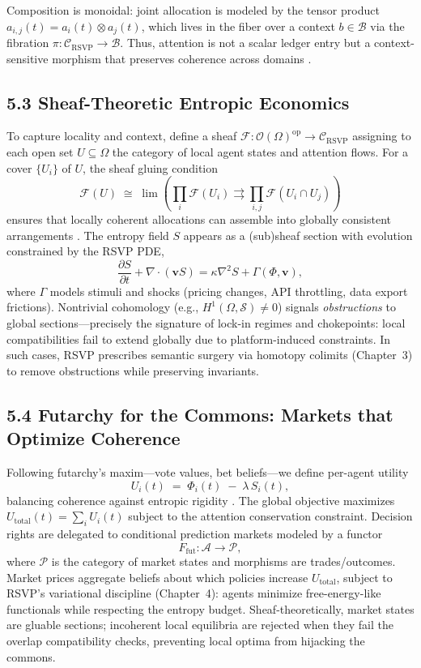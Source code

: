 \documentclass[12pt]{article}
\begin{document}
Composition is monoidal: joint allocation is modeled by the tensor product
\(a_{i,j}(t) = a_i(t) \otimes a_j(t)\), which lives in the fiber over a context
\(b \in \mathcal{B}\) via the fibration \(\pi:\mathcal{C}_{\text{RSVP}}\!\to\!\mathcal{B}\).
Thus, attention is not a scalar ledger entry but a context-sensitive morphism that
preserves coherence across domains \citep{lawvere2009, cover2006}.

\subsection*{5.3 Sheaf-Theoretic Entropic Economics}

To capture locality and context, define a sheaf
\(\mathcal{F}:\mathcal{O}(\Omega)^{\mathrm{op}}\!\to\!\mathcal{C}_{\text{RSVP}}\)
assigning to each open set \(U\subseteq\Omega\) the category of local agent states and
attention flows. For a cover \(\{U_i\}\) of \(U\), the sheaf gluing condition
\[
\mathcal{F}(U) \;\cong\; \lim\!\left(
\prod_i \mathcal{F}(U_i) \rightrightarrows
\prod_{i,j} \mathcal{F}(U_i \cap U_j)
\right)
\]
ensures that locally coherent allocations can assemble into globally consistent
arrangements \citep{maclane1998, hatcher2002}. The entropy field \(S\) appears as a
(sub)sheaf section with evolution constrained by the RSVP PDE,
\[
\frac{\partial S}{\partial t} + \nabla\!\cdot(\mathbf{v}S)
= \kappa \nabla^2 S + \Gamma(\Phi,\mathbf{v}),
\]
where \(\Gamma\) models stimuli and shocks (pricing changes, API throttling, data
export frictions). Nontrivial cohomology (e.g., \(H^1(\Omega,\mathcal{S}) \neq 0\))
signals \emph{obstructions} to global sections—precisely the signature of
lock-in regimes and chokepoints: local compatibilities fail to extend globally due to
platform-induced constraints. In such cases, RSVP prescribes semantic surgery via
homotopy colimits (Chapter~3) to remove obstructions while preserving invariants.

\subsection*{5.4 Futarchy for the Commons: Markets that Optimize Coherence}

Following futarchy’s maxim—vote values, bet beliefs—we define per-agent utility
\[
U_i(t) \;=\; \Phi_i(t) \;-\; \lambda\, S_i(t),
\]
balancing coherence against entropic rigidity \citep{hanson2003}. The global objective
maximizes \(U_{\mathrm{total}}(t)=\sum_i U_i(t)\) subject to the attention conservation
constraint. Decision rights are delegated to conditional prediction markets modeled by a
functor
\[
F_{\mathrm{fut}}:\mathcal{A} \longrightarrow \mathcal{P},
\]
where \(\mathcal{P}\) is the category of market states and morphisms are trades/outcomes.
Market prices aggregate beliefs about which policies increase \(U_{\mathrm{total}}\),
subject to RSVP’s variational discipline (Chapter~4): agents minimize free-energy-like
functionals while respecting the entropy budget. Sheaf-theoretically, market states are
gluable sections; incoherent local equilibria are rejected when they fail the overlap
compatibility checks, preventing local optima from hijacking the commons.
\end{document}
